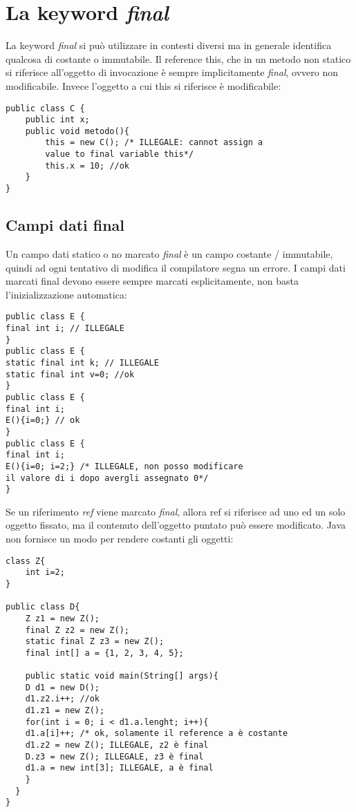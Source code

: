\section{La keyword \textit{final}}
La keyword \textit{final} si può utilizzare in contesti diversi ma in generale identifica qualcosa di costante o immutabile.
Il reference this, che in un metodo non statico si riferisce all'oggetto di invocazione è sempre implicitamente \textit{final}, ovvero non modificabile. Invece l'oggetto a cui this si riferisce è modificabile:
\begin{lstlisting}
public class C {
	public int x;
	public void metodo(){
		this = new C(); /* ILLEGALE: cannot assign a 
		value to final variable this*/
		this.x = 10; //ok
	}
}
\end{lstlisting}

\subsection{Campi dati final}
Un campo dati statico o no marcato \textit{final} è un campo costante / immutabile, quindi ad ogni tentativo di modifica il compilatore segna un errore.
I campi dati marcati final devono essere sempre marcati esplicitamente, non basta l'inizializzazione automatica:
\begin{lstlisting}
public class E {
final int i; // ILLEGALE
}
public class E {
static final int k; // ILLEGALE
static final int v=0; //ok
}
public class E {
final int i;
E(){i=0;} // ok
}
public class E {
final int i;
E(){i=0; i=2;} /* ILLEGALE, non posso modificare
il valore di i dopo avergli assegnato 0*/
}
\end{lstlisting}
Se un riferimento \textit{ref} viene marcato \textit{final}, allora ref si riferisce ad uno ed un solo oggetto fissato, ma il contenuto dell'oggetto puntato può essere modificato. Java non fornisce un modo per rendere costanti gli oggetti:
\begin{lstlisting}
class Z{
	int i=2;
}

public class D{
	Z z1 = new Z();
	final Z z2 = new Z();
	static final Z z3 = new Z();
	final int[] a = {1, 2, 3, 4, 5};

	public static void main(String[] args){
	D d1 = new D();
	d1.z2.i++; //ok
	d1.z1 = new Z();
	for(int i = 0; i < d1.a.lenght; i++){
	d1.a[i]++; /* ok, solamente il reference a è costante
	d1.z2 = new Z(); ILLEGALE, z2 è final
	D.z3 = new Z(); ILLEGALE, z3 è final
	d1.a = new int[3]; ILLEGALE, a è final
	}
  } 
}
\end{lstlisting}

